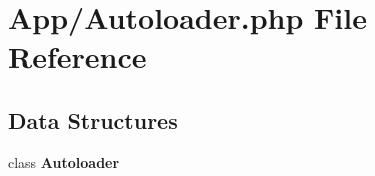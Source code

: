 \section{App/\+Autoloader.php File Reference}
\label{_autoloader_8php}
\subsection*{Data Structures}
\begin{DoxyCompactItemize}
\item 
class \textbf{ Autoloader}
\end{DoxyCompactItemize}
